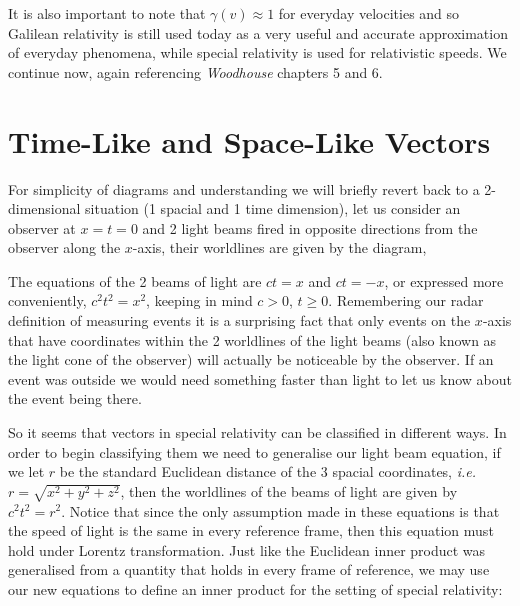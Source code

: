 \documentclass[a4paper,12pt,draft]{report}
\begin{document}
It is also important to note that $\gamma(v) \approx 1$ for everyday velocities and so Galilean relativity is still used today as a very useful and accurate approximation of everyday phenomena, while special relativity is used for relativistic speeds. We continue now, again referencing \emph{Woodhouse} \cite{NMJW} chapters 5 and 6.

\section{Time-Like and Space-Like Vectors}

For simplicity of diagrams and understanding we will briefly revert back to a 2-dimensional situation (1 spacial and 1 time dimension), let us consider an observer at $x = t = 0$ and 2 light beams fired in opposite directions from the observer along the $x$-axis, their worldlines are given by the diagram,
\begin{center}
\end{center}
The equations of the 2 beams of light are $ct = x$ and $ct = -x$, or expressed more conveniently, $c^2t^2 = x^2$, keeping in mind $c > 0$, $t \ge 0$. Remembering our radar definition of measuring events it is a surprising fact that only events on the $x$-axis that have coordinates within the 2 worldlines of the light beams (also known as the light cone of the observer) will actually be noticeable by the observer. If an event was outside we would need something faster than light to let us know about the event being there.

So it seems that vectors in special relativity can be classified in different ways. In order to begin classifying them we need to generalise our light beam equation, if we let $r$ be the standard Euclidean distance of the 3 spacial coordinates, \emph{i.e.} $r = \sqrt{x^2 + y^2 + z^2}$, then the worldlines of the beams of light are given by $c^2t^2 = r^2$. Notice that since the only assumption made in these equations is that the speed of light is the same in every reference frame, then this equation must hold under Lorentz transformation. Just like the Euclidean inner product was generalised from a quantity that holds in every frame of reference, we may use our new equations to define an inner product for the setting of special relativity:
\end{document}
